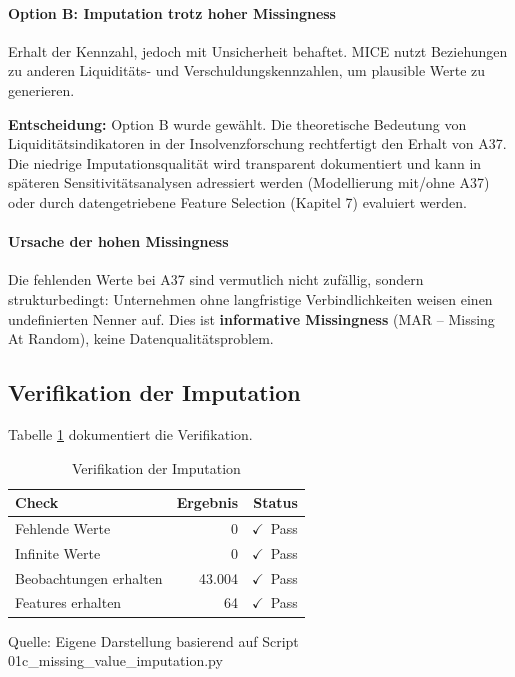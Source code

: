 \paragraph{Option B: Imputation trotz hoher Missingness} Erhalt der Kennzahl, jedoch mit Unsicherheit behaftet. MICE nutzt Beziehungen zu anderen Liquiditäts- und Verschuldungskennzahlen, um plausible Werte zu generieren.

\textbf{Entscheidung:} Option B wurde gewählt. Die theoretische Bedeutung von Liquiditätsindikatoren in der Insolvenzforschung rechtfertigt den Erhalt von A37. Die niedrige Imputationsqualität wird transparent dokumentiert und kann in späteren Sensitivitätsanalysen adressiert werden (Modellierung mit/ohne A37) oder durch datengetriebene Feature Selection (Kapitel 7) evaluiert werden.

\paragraph{Ursache der hohen Missingness} Die fehlenden Werte bei A37 sind vermutlich nicht zufällig, sondern strukturbedingt: Unternehmen ohne langfristige Verbindlichkeiten weisen einen undefinierten Nenner auf. Dies ist \textbf{informative Missingness} (MAR – Missing At Random), keine Datenqualitätsproblem.

\subsection{Verifikation der Imputation}

Tabelle \ref{tab:imputation_verification} dokumentiert die Verifikation.

\begin{table}[htbp]
\centering
\caption{Verifikation der Imputation}
\label{tab:imputation_verification}
\begin{tabular}{lrr}
\toprule
\textbf{Check} & \textbf{Ergebnis} & \textbf{Status} \\
\midrule
Fehlende Werte & 0 & $\checkmark$\ Pass \\
Infinite Werte & 0 & $\checkmark$\ Pass \\
Beobachtungen erhalten & 43.004 & $\checkmark$\ Pass \\
Features erhalten & 64 & $\checkmark$\ Pass \\
\bottomrule
\end{tabular}
\par\smallskip
{\footnotesize Quelle: Eigene Darstellung basierend auf Script 01c\_missing\_value\_imputation.py}
\end{table}

